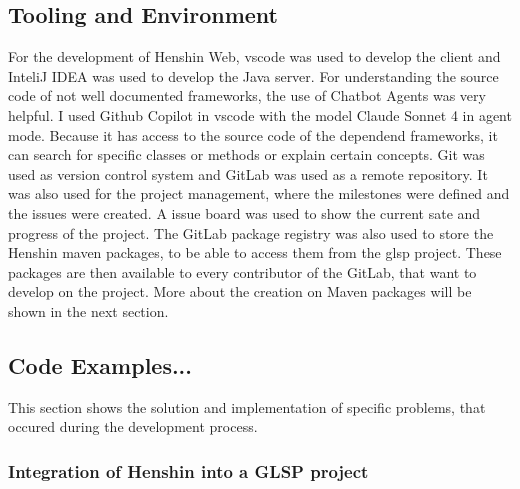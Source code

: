   \subsection{Tooling and Environment}
  \label{subsec:tooling}
  For the development of Henshin Web, \ac{vscode} \cite{vscode} was used to develop the client and InteliJ IDEA \cite{intellij} was used to develop the Java server.
  For understanding the source code of not well documented frameworks, the use of Chatbot Agents was very helpful. I used Github Copilot in \ac{vscode} with the model Claude Sonnet 4 \cite{claude_sonnet} in agent mode. Because it has access to the source code of the dependend frameworks, it can search for specific classes or methods or explain certain concepts.
  Git was used as version control system and GitLab was used as a remote repository. It was also used for the project management, where the milestones were defined and the issues were created. A issue board was used to show the current sate and progress of the project. The GitLab package registry was also used to store the Henshin maven packages, to be able to access them from the \ac{glsp} project. These packages are then available to every contributor of the GitLab, that want to develop on the project. More about the creation on Maven packages will be shown in the next section.

  \subsection{Code Examples...}
  \label{subsec:code-examples}

  This section shows the solution and implementation of specific problems, that occured during the development process.

  \subsubsection{Integration of Henshin into a GLSP project} 
  \label{subsec:henshin-glsp}

